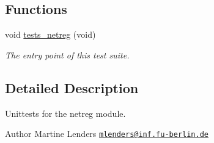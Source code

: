 \subsection*{Functions}
\begin{DoxyCompactItemize}
\item 
void \hyperlink{group__unittests_ga9597c8b9433b48f9ce8be48a398bd607}{tests\+\_\+netreg} (void)
\begin{DoxyCompactList}\small\item\em The entry point of this test suite. \end{DoxyCompactList}\end{DoxyCompactItemize}


\subsection{Detailed Description}
Unittests for the {\ttfamily netreg} module. 

\begin{DoxyAuthor}{Author}
Martine Lenders \href{mailto:mlenders@inf.fu-berlin.de}{\tt mlenders@inf.\+fu-\/berlin.\+de} 
\end{DoxyAuthor}
